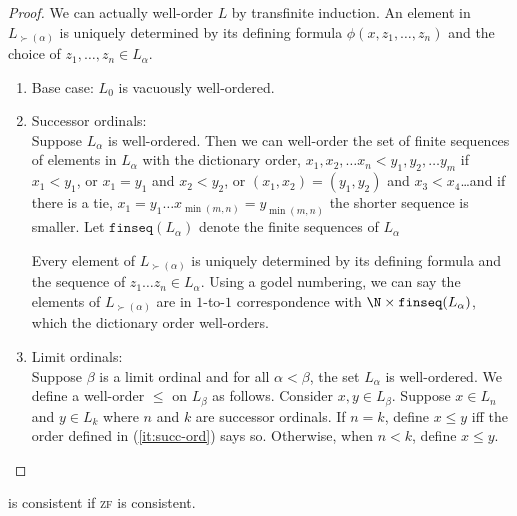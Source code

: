\message{ !name(truth.tex)}\documentclass{scrbook}
\begin{document}
\begin{proof}
  We can actually well-order $L$ by transfinite induction. An element in $L_{\succ(\alpha)}$ is uniquely determined by its defining formula $\phi(x,z_1,\dots,z_n)$ and the choice of $z_1,\dots,z_n\in L_\alpha$.
  \begin{enumerate}
  \item Base case: $L_0$ is vacuously well-ordered. 
  \item Successor ordinals: \label{it:succ-ord}\\
    Suppose $L_\alpha$ is well-ordered. Then we can well-order the set of finite sequences of elements in $L_\alpha$ with the dictionary order, \ie $x_1,x_2,\dots x_n < y_1,y_2, \dots y_m$ if $x_1 < y_1$, or $x_1 = y_1$ and $x_2 < y_2$, or $(x_1,x_2)=(y_1,y_2)$ and $x_3 < x_4$\dots and if there is a tie, \ie $x_1=y_1\dots x_{\min (m,n)}=y_{\min(m,n)}$ the shorter sequence is smaller. Let $\texttt{finseq}(L_\alpha)$ denote the finite sequences of $L_\alpha$ 

    Every element of $L_{\succ(\alpha)}$ is uniquely determined by its defining formula and the sequence of $z_1\dots z_n\in L_\alpha$. Using a godel numbering, we can say the elements of $L_{\succ(\alpha)}$ are in $1$-to-$1$ correspondence with $\N\times \texttt{finseq}(L_\alpha)$, which the dictionary order well-orders. 
  \item Limit ordinals: \\
    Suppose $\beta$ is a limit ordinal and for all $\alpha < \beta$, the set $L_\alpha$ is well-ordered. We define a well-order $\leq$ on $L_\beta$ as follows. Consider $x,y\in L_\beta$. Suppose $x\in L_n$ and $y\in L_k$ where $n$ and $k$ are successor ordinals. If $n=k$, define $x \leq y$ iff the order defined in (\ref{it:succ-ord}) says so. Otherwise, when $n < k$, define $x \leq y$. 
  \end{enumerate}
\end{proof}
\begin{cor}
  \zfc is consistent if \textsc{zf} is consistent.
\end{cor}
\end{document}
